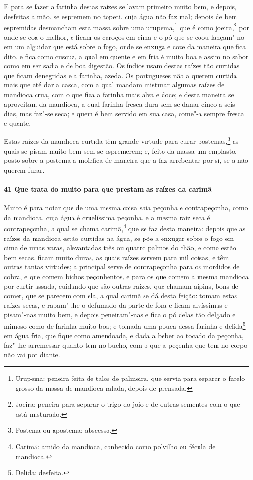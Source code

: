 E para se fazer a farinha destas raízes se lavam primeiro muito bem, e depois, desfeitas a
mão, se espremem no topeti, cuja água não faz mal; depois de
bem espremidas desmancham esta massa sobre uma urupema,\footnote{ Urupema: peneira feita
de talos de palmeira, que servia para separar o farelo grosso da massa de mandioca ralada,
depois de prensada.} que é como joeira,\footnote{ Joeira: peneira para separar o trigo do
joio e de outras sementes com o que está misturado.} por onde se coa o melhor, e ficam os
caroços em cima e o pó que se coou lançam"-no em um alguidar que está sobre o fogo, onde se
enxuga e coze da maneira que fica dito, e fica como cuscuz, a qual em quente e em fria é
muito boa e assim no sabor como em ser sadia e de boa digestão. Os índios usam destas
raízes tão curtidas que ficam denegridas e a farinha, azeda. Os portugueses não a querem
curtida mais que até dar a casca, com a qual mandam misturar algumas raízes de mandioca
crua, com o que fica a farinha mais alva e doce; e desta maneira se aproveitam da
mandioca, a qual farinha fresca dura sem se danar cinco a seis dias, mas faz"-se seca; e
quem é bem servido em sua casa, come"-a sempre fresca e quente.

Estas raízes da mandioca curtida têm grande virtude para curar postemas,\footnote{ Postema
ou apostema: abscesso.} as quais se pisam muito bem sem se espremerem; e, feito da massa
um emplasto, posto sobre a postema a molefica de maneira que a faz arrebentar por si, se a
não querem furar.

\paragraph{41 Que trata do muito para que prestam as raízes da carimã}

Muito é para notar que de uma mesma coisa saia peçonha e contrapeçonha, como da mandioca,
cuja água é cruelíssima peçonha, e a mesma raiz seca é contrapeçonha, a qual se chama
carimã,\footnote{ Carimã: amido da mandioca, conhecido como polvilho ou fécula de
mandioca.} que se faz desta maneira: depois que as raízes da mandioca estão curtidas na
água, se põe a enxugar sobre o fogo em cima de umas varas, alevantadas três ou quatro
palmos do chão, e como estão bem secas, ficam muito duras, as quais raízes servem para mil
coisas, e têm outras tantas virtudes; a principal serve de contrapeçonha para os mordidos
de cobra, e que comem bichos peçonhentos, e para os que comem a mesma mandioca por curtir
assada, cuidando que são outras raízes, que chamam aipins, bons de comer, que se parecem
com ela, a qual carimã se dá desta feição: tomam estas raízes secas, e rapam"-lhe o
defumado da parte de fora e ficam alvíssimas e pisam"-nas muito bem, e depois peneiram"-nas
e fica o pó delas tão delgado e mimoso como de farinha muito boa; e tomada uma pouca dessa
farinha e delida\footnote{ Delida: desfeita.} em água fria, que fique como 
amendoada, e dada a beber ao tocado da peçonha, faz"-lhe arremessar quanto tem no bucho,
com o que a peçonha que tem no corpo não vai por diante.

